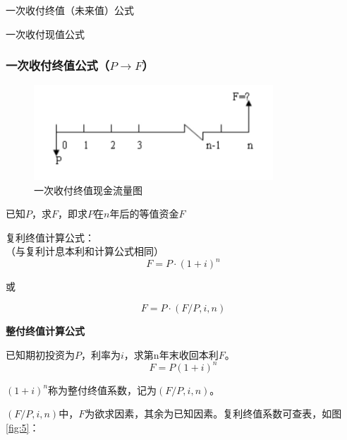 一次收付终值（未来值）公式

一次收付现值公式

\subsubsection{一次收付终值公式（$P \to F$）}

\begin{figure}[H]
    \centering
    \includegraphics[width=0.8\textwidth]{image/一次收付终值现金流量图.png}
    \caption{一次收付终值现金流量图}
    \label{fig:3}
\end{figure}

已知$P$，求$F$，即求$P$在$n$年后的等值资金$F$

复利终值计算公式：\\
（与复利计息本利和计算公式相同）
$$F=P \cdot (1+i)^n$$

或

$$F=P \cdot (F/P,i,n)$$



\textbf{整付终值计算公式}

已知期初投资为$P$，利率为$i$，求第n年末收回本利$F$。
$$F=P(1+i)^n$$

$(1+i)^n$称为整付终值系数，记为$(F/P,i,n)$。

$(F/P,i,n)$中，$F$为欲求因素，其余为已知因素。复利终值系数可查表，如图\ref{fig:5}：

